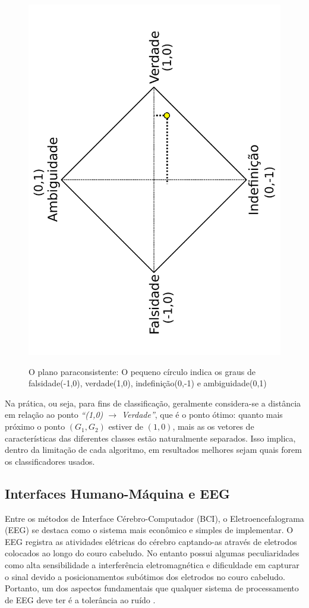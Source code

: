 			\begin{figure}[H]
				\centering
				\caption[O plano paraconsistente]{O plano paraconsistente: O pequeno círculo indica os graus de falsidade(-1,0), verdade(1,0), indefinição(0,-1) e ambiguidade(0,1)}
				\includegraphics[angle=-90, width=0.69\linewidth]{images/paraconsistentPlane.pdf}
				\label{fig:paraconsistentplane}
			\end{figure}
			\par Na prática, ou seja, para fins de classificação, geralmente considera-se a distância em relação ao ponto \textit{``(1,0) $\rightarrow$ Verdade''}, que é o ponto ótimo: quanto mais próximo o ponto $(G_1,G_2)$ estiver de $(1,0)$, mais as os vetores de características das diferentes classes estão naturalmente separados. Isso implica, dentro da limitação de cada algoritmo, em resultados melhores sejam quais forem os classificadores usados.
	
		\subsection{Interfaces Humano-Máquina e EEG}
			\label{subsec:BCIEEG}
			
			\par Entre os métodos de Interface Cérebro-Computador (BCI), o Eletroencefalograma (EEG) se destaca como o sistema mais econômico e simples de implementar. O EEG registra as atividades elétricas do cérebro captando-as através de eletrodos colocados ao longo do couro cabeludo. No entanto possui algumas peculiaridades como alta sensibilidade a interferência eletromagnética e dificuldade em capturar o sinal devido a posicionamentos subótimos dos eletrodos no couro cabeludo. Portanto, um dos aspectos fundamentais que qualquer sistema de processamento de EEG deve ter é a tolerância ao ruído \cite{JALALYBIDGOLY2020101788}.
			
